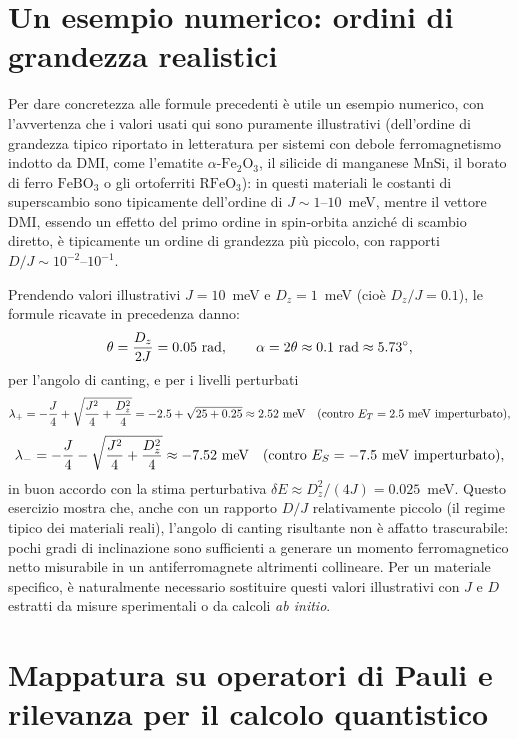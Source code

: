 \documentclass[11pt,a4paper]{article}
\begin{document}
\section{Un esempio numerico: ordini di grandezza realistici}

Per dare concretezza alle formule precedenti \`e utile un esempio numerico, con
l'avvertenza che i valori usati qui sono puramente illustrativi (dell'ordine di
grandezza tipico riportato in letteratura per sistemi con debole ferromagnetismo
indotto da DMI, come l'ematite $\alpha$-$\mathrm{Fe}_2\mathrm{O}_3$, il silicide di
manganese $\mathrm{MnSi}$, il borato di ferro $\mathrm{FeBO}_3$ o gli ortoferriti
$\mathrm{RFeO}_3$): in questi materiali le costanti di superscambio sono tipicamente
dell'ordine di $J\sim1$--$10$~meV, mentre il vettore DMI, essendo un effetto del primo
ordine in spin-orbita anzich\'e di scambio diretto, \`e tipicamente un ordine di
grandezza pi\`u piccolo, con rapporti $D/J\sim10^{-2}$--$10^{-1}$.

Prendendo valori illustrativi $J=10$~meV e $D_z=1$~meV (cio\`e $D_z/J=0.1$), le
formule ricavate in precedenza danno:
$$\theta = \frac{D_z}{2J} = 0.05\ {\rm rad}, \qquad \alpha = 2\theta \approx 0.1\ {\rm rad}\approx5.73^\circ,$$
per l'angolo di canting, e per i livelli perturbati
$$\lambda_+ = -\frac{J}{4}+\sqrt{\frac{J^2}{4}+\frac{D_z^2}{4}} = -2.5+\sqrt{25+0.25}\approx2.52\ {\rm meV} \quad (\text{contro } E_T=2.5\ {\rm meV\ imperturbato}),$$
$$\lambda_- = -\frac{J}{4}-\sqrt{\frac{J^2}{4}+\frac{D_z^2}{4}} \approx -7.52\ {\rm meV} \quad (\text{contro } E_S=-7.5\ {\rm meV\ imperturbato}),$$
in buon accordo con la stima perturbativa $\delta E\approx D_z^2/(4J)=0.025$~meV.
Questo esercizio mostra che, anche con un rapporto $D/J$ relativamente piccolo (il
regime tipico dei materiali reali), l'angolo di canting risultante non \`e affatto
trascurabile: pochi gradi di inclinazione sono sufficienti a generare un momento
ferromagnetico netto misurabile in un antiferromagnete altrimenti collineare. Per un
materiale specifico, \`e naturalmente necessario sostituire questi valori illustrativi
con $J$ e $D$ estratti da misure sperimentali o da calcoli \emph{ab initio}.

\section{Mappatura su operatori di Pauli e rilevanza per il calcolo quantistico}
\end{document}
